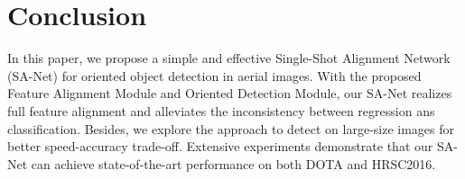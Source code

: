 \documentclass[10pt,journal,final]{IEEEtran}
\begin{document}
\section{Conclusion}
\label{sec:conclusion}
In this paper, we propose a simple and effective Single-Shot Alignment Network (SA-Net) for oriented object detection in aerial images. With the proposed Feature Alignment Module and Oriented Detection Module, our SA-Net realizes full feature alignment and alleviates the inconsistency between regression ans classification. Besides, we explore the approach to detect on large-size images for better speed-accuracy trade-off. Extensive experiments demonstrate that our SA-Net can achieve state-of-the-art performance on both DOTA and HRSC2016.

\nocite{*}
{

\small

}
\end{document}
